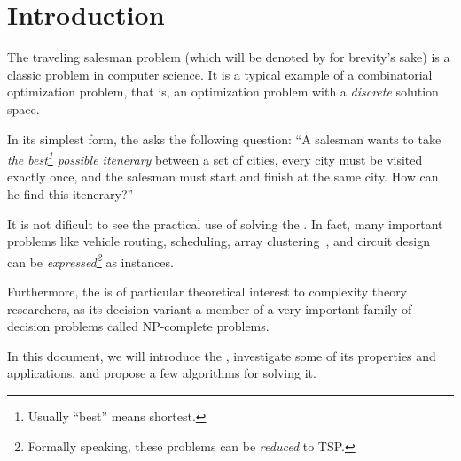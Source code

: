 \chapter*{Introduction}

The traveling salesman problem (which will be denoted by \TSP{} for brevity's sake) is a classic problem in computer science. It is a typical example of a combinatorial optimization problem, that is, an optimization problem with a \emph{discrete} solution space.

In its simplest form, the \TSP{} asks the following question: ``A salesman wants to take \emph{the best\footnote{Usually ``best'' means shortest.} possible itenerary} between a set of cities, every city must be visited exactly once, and the salesman must start and finish at the same city. How can he find this itenerary?''

It is not dificult to see the practical use of solving the \TSP. 
In fact, many important problems like vehicle routing, scheduling, array clustering~\cite{tsp-tour}, and circuit design~\cite{tsp-computational-solutions} can be \emph{expressed\footnote{Formally speaking, these problems can be \emph{reduced} to \textsf{TSP.}}} as \TSP{} instances.

Furthermore, the \TSP{} is of particular theoretical interest to complexity theory researchers, as its decision variant a member of a very important family of decision problems called \textsf{NP}-complete problems.

In this document, we will introduce the \TSP, investigate some of its properties and applications, and propose a few algorithms for solving it.
